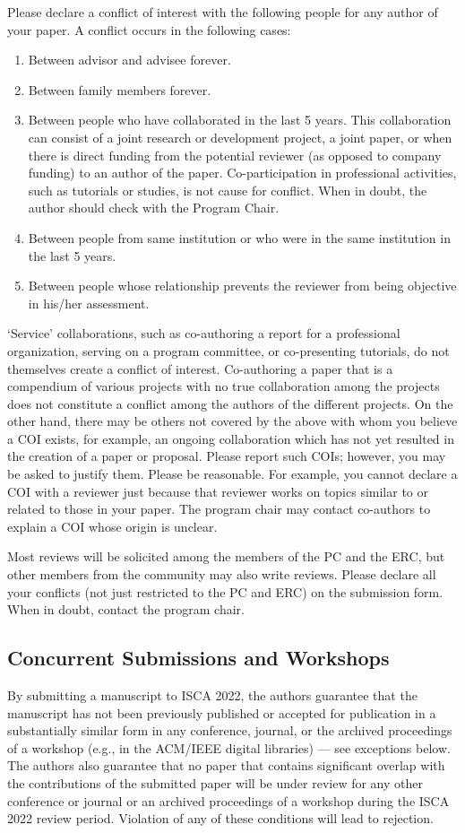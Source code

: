 \documentclass[conference]{IEEEtran}
\begin{document}
Please declare a conflict of interest with the following people for any author of your paper.
A conflict occurs in the following cases:
\begin{enumerate}
\item Between advisor and advisee forever.
\item Between family members forever.
\item Between people who have collaborated in the last 5 years. This
  collaboration can consist of a joint research or development
  project, a joint paper, or when there is direct funding from the
  potential reviewer (as opposed to company funding) to an author of
  the paper. Co-participation in professional activities, such as
  tutorials or studies, is not cause for conflict. When in doubt, the
  author should check with the Program Chair.
\item Between people from same institution or who were in the same
  institution in the last 5 years.
\item Between people whose relationship prevents the reviewer from
  being objective in his/her assessment.
\end{enumerate}

`Service' collaborations, such as co-authoring a report for a
professional organization, serving on a program committee, or
co-presenting tutorials, do not themselves create a conflict of
interest. Co-authoring a paper that is a compendium of various
projects with no true collaboration among the projects does not
constitute a conflict among the authors of the different projects. On
the other hand, there may be others not covered by the above with whom
you believe a COI exists, for example, an ongoing collaboration which
has not yet resulted in the creation of a paper or proposal. Please
report such COIs; however, you may be asked to justify them. Please be
reasonable. For example, you cannot declare a COI with a reviewer just
because that reviewer works on topics similar to or related to those
in your paper.  The program chair may contact co-authors to explain a COI
whose origin is unclear.

Most reviews will be solicited among the members of the PC and the ERC, but other
members from the community may also write reviews. Please declare all
your conflicts (not just restricted to the PC and ERC) on the
submission form. When in doubt, contact the program chair.


\subsection{Concurrent Submissions and Workshops}
By submitting a manuscript to ISCA 2022, the authors guarantee that
the manuscript has not been previously published or accepted for
publication in a substantially similar form in any conference,
journal, or the archived proceedings of a workshop (e.g., in the
ACM/IEEE digital libraries) --- see exceptions below. The authors also
guarantee that no paper that contains significant overlap with the
contributions of the submitted paper will be under review for any
other conference or journal or an archived proceedings of a workshop
during the ISCA 2022 review period. Violation of any of these
conditions will lead to rejection.
\end{document}
